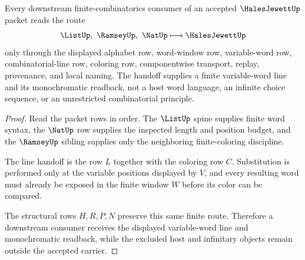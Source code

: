 \begin{theorem}
\label{thm:hales-jewett-finite-line-handoff}
Every downstream finite-combinatorics consumer of an accepted $\HalesJewettUp$ packet reads the route
$$
\ListUp,\ \RamseyUp,\ \NatUp \longmapsto \HalesJewettUp
$$
only through the displayed alphabet row, word-window row, variable-word row, combinatorial-line row, coloring row, componentwise transport, replay, provenance, and local naming. The handoff supplies a finite variable-word line and its monochromatic readback, not a host word language, an infinite choice sequence, or an unrestricted combinatorial principle.
\end{theorem}
\begin{proof}
Read the packet rows in order. The $\ListUp$ spine supplies finite word syntax, the $\NatUp$ row supplies the inspected length and position budget, and the $\RamseyUp$ sibling supplies only the neighboring finite-coloring discipline.

The line handoff is the row $L$ together with the coloring row $C$. Substitution is performed only at the variable positions displayed by $V$, and every resulting word must already be exposed in the finite window $W$ before its color can be compared.

The structural rows $H,R,P,N$ preserve this same finite route. Therefore a downstream consumer receives the displayed variable-word line and monochromatic readback, while the excluded host and infinitary objects remain outside the accepted carrier.
\end{proof}




